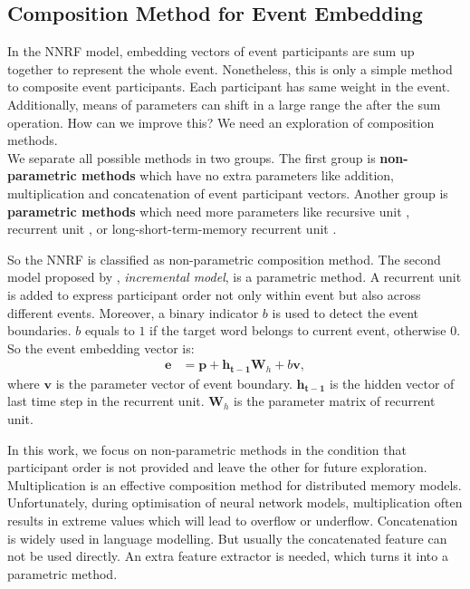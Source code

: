 \documentclass[a4paper]{article}
\begin{document}
\subsection{Composition Method for Event Embedding} \label{sec:composition}
In the NNRF model, embedding vectors of event participants are sum up together to represent the whole event. Nonetheless, this is only a simple method to composite event participants. Each participant has same weight in the event. Additionally, means of parameters can shift in a large range the after the sum operation. How can we improve this? We need an exploration of composition methods. \\
We separate all possible methods in two groups. The first group is \textbf{non-parametric methods} which have no extra parameters like addition, multiplication and concatenation of event participant vectors. Another group is \textbf{parametric methods} which need more parameters like recursive unit \citep{socher2013recursive}, recurrent unit \citet{mikolov2010recurrent}, or long-short-term-memory recurrent unit \citep{hochreiter1997LSTM}. 

So the NNRF is classified as non-parametric composition method. The second model proposed by \citet{tilk2016event}, \textit{incremental model}, is a parametric method. A recurrent unit is added to express participant order not only within event but also across different events. Moreover, a binary indicator $b$ is used to detect the event boundaries. $b$ equals to $1$ if the target word belongs to current event, otherwise $0$. So the event embedding vector is: 
\begin{equation} \label{eq:incremental}
\begin{aligned}
    \mathbf{e} 
        &= \mathbf{p} + \mathbf{h_{t-1}}\mathbf{W}_h + b\mathbf{v}, 
\end{aligned}
\end{equation}
where $\mathbf{v}$ is the parameter vector of event boundary. $\mathbf{h_{t-1}}$ is the hidden vector of last time step in the recurrent unit. $\mathbf{W}_h$ is the parameter matrix of recurrent unit. 

In this work, we focus on non-parametric methods in the condition that participant order is not provided and leave the other for future exploration. Multiplication is an effective composition method for distributed memory models. Unfortunately, during optimisation of neural network models, multiplication often results in extreme values which will lead to overflow or underflow. Concatenation is widely used in language modelling. But usually the concatenated feature can not be used directly. An extra feature extractor is needed, which turns it into a parametric method. 
\end{document}
